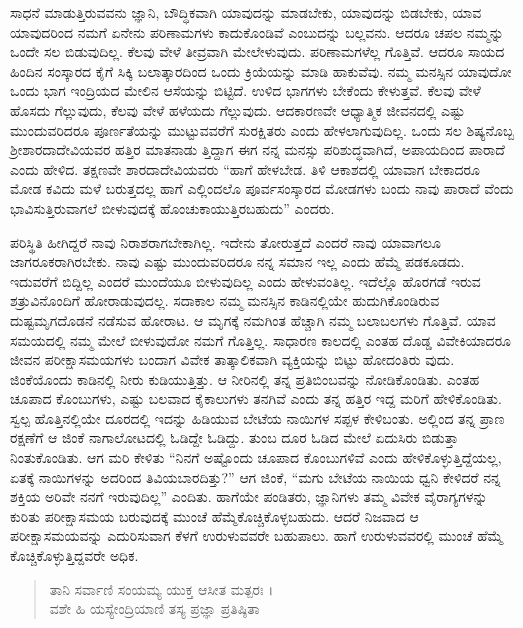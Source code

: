 ಸಾಧನೆ ಮಾಡುತ್ತಿರುವವನು ಜ್ಞಾನಿ, ಬೌದ್ಧಿಕವಾಗಿ ಯಾವುದನ್ನು ಮಾಡಬೇಕು, ಯಾವುದನ್ನು ಬಿಡಬೇಕು, ಯಾವ ಯಾವುದರಿಂದ ನಮಗೆ ಏನೇನು ಪರಿಣಾಮಗಳು ಕಾದುಕೊಂಡಿವೆ ಎಂಬುದನ್ನು ಬಲ್ಲವನು. ಆದರೂ ಚಪಲ ನಮ್ಮನ್ನು ಒಂದೇ ಸಲ ಬಿಡುವುದಿಲ್ಲ. ಕೆಲವು ವೇಳೆ ತೀವ್ರವಾಗಿ ಮೇಲೇಳುವುದು. ಪರಿಣಾಮಗಳೆಲ್ಲ ಗೊತ್ತಿವೆ. ಆದರೂ ಸಾಯದ ಹಿಂದಿನ ಸಂಸ್ಕಾರದ ಕೈಗೆ ಸಿಕ್ಕಿ ಬಲಾತ್ಕಾರದಿಂದ ಒಂದು ಕ್ರಿಯೆಯನ್ನು ಮಾಡಿ ಹಾಕುವೆವು. ನಮ್ಮ ಮನಸ್ಸಿನ ಯಾವುದೋ ಒಂದು ಭಾಗ ಇಂದ್ರಿಯದ ಮೇಲಿನ ಆಸೆಯನ್ನು ಬಿಟ್ಟಿದೆ. ಉಳಿದ ಭಾಗಗಳು ಬೇಕೆಂದು ಕೇಳುತ್ತವೆ. ಕೆಲವು ವೇಳೆ ಹೊಸದು ಗೆಲ್ಲುವುದು, ಕೆಲವು ವೇಳೆ ಹಳೆಯದು ಗೆಲ್ಲುವುದು. ಆದಕಾರಣವೇ ಆಧ್ಯಾತ್ಮಿಕ ಜೀವನದಲ್ಲಿ ಎಷ್ಟು ಮುಂದುವರಿದರೂ ಪೂರ್ಣತೆಯನ್ನು ಮುಟ್ಟುವವರೆಗೆ ಸುರಕ್ಷಿತರು ಎಂದು ಹೇಳಲಾಗುವುದಿಲ್ಲ. ಒಂದು ಸಲ ಶಿಷ್ಯನೊಬ್ಬ ಶ್ರೀಶಾರದಾದೇವಿಯವರ ಹತ್ತಿರ ಮಾತನಾಡು ತ್ತಿದ್ದಾಗ ಈಗ ನನ್ನ ಮನಸ್ಸು ಪರಿಶುದ್ಧವಾಗಿದೆ, ಅಪಾಯದಿಂದ ಪಾರಾದೆ ಎಂದು ಹೇಳಿದ. ತಕ್ಷಣವೇ ಶಾರದಾದೇವಿಯವರು “ಹಾಗೆ ಹೇಳಬೇಡ. ತಿಳಿ ಆಕಾಶದಲ್ಲಿ ಯಾವಾಗ ಬೇಕಾದರೂ ಮೋಡ ಕವಿದು ಮಳೆ ಬರುತ್ತದಲ್ಲ ಹಾಗೆ ಎಲ್ಲಿಂದಲೊ ಪೂರ್ವಸಂಸ್ಕಾರದ ಮೋಡಗಳು ಬಂದು ನಾವು ಪಾರಾದೆ ವೆಂದು ಭಾವಿಸುತ್ತಿರುವಾಗಲೆ ಬೀಳುವುದಕ್ಕೆ ಹೊಂಚುಕಾಯುತ್ತಿರಬಹುದು” ಎಂದರು.

ಪರಿಸ್ಥಿತಿ ಹೀಗಿದ್ದರೆ ನಾವು ನಿರಾಶರಾಗಬೇಕಾಗಿಲ್ಲ. ಇದೇನು ತೋರುತ್ತದೆ ಎಂದರೆ ನಾವು ಯಾವಾಗಲೂ ಜಾಗರೂಕರಾಗಿರಬೇಕು. ನಾವು ಎಷ್ಟು ಮುಂದುವರಿದರೂ ನನ್ನ ಸಮಾನ ಇಲ್ಲ ಎಂದು ಹೆಮ್ಮೆ ಪಡಕೂಡದು. ಇದುವರೆಗೆ ಬಿದ್ದಿಲ್ಲ ಎಂದರೆ ಮುಂದೆಯೂ ಬೀಳುವುದಿಲ್ಲ ಎಂದು ಹೇಳುವಂತಿಲ್ಲ. ಇದೆಲ್ಲೊ ಹೊರಗಡೆ ಇರುವ ಶತ್ರುವಿನೊಂದಿಗೆ ಹೋರಾಡುವುದಲ್ಲ. ಸದಾಕಾಲ ನಮ್ಮ ಮನಸ್ಸಿನ ಕಾಡಿನಲ್ಲಿಯೇ ಹುದುಗಿಕೊಂಡಿರುವ ದುಷ್ಟಮೃಗದೊಡನೆ ನಡೆಸುವ ಹೋರಾಟ. ಆ ಮೃಗಕ್ಕೆ ನಮಗಿಂತ ಹೆಚ್ಚಾಗಿ ನಮ್ಮ ಬಲಾಬಲಗಳು ಗೊತ್ತಿವೆ. ಯಾವ ಸಮಯದಲ್ಲಿ ನಮ್ಮ ಮೇಲೆ ಬೀಳುವುದೋ ನಮಗೆ ಗೊತ್ತಿಲ್ಲ. ಸಾಧಾರಣ ಕಾಲದಲ್ಲಿ ಎಂತಹ ದೊಡ್ಡ ವಿವೇಕಿಯಾದರೂ ಜೀವನ ಪರೀಕ್ಷಾಸಮಯಗಳು ಬಂದಾಗ ವಿವೇಕ ತಾತ್ಕಾಲಿಕವಾಗಿ ವ್ಯಕ್ತಿಯನ್ನು ಬಿಟ್ಟು ಹೋದಂತಿರು ವುದು. ಜಿಂಕೆಯೊಂದು ಕಾಡಿನಲ್ಲಿ ನೀರು ಕುಡಿಯುತ್ತಿತ್ತು. ಆ ನೀರಿನಲ್ಲಿ ತನ್ನ ಪ್ರತಿಬಿಂಬವನ್ನು ನೋಡಿಕೊಂಡಿತು. ಎಂತಹ ಚೂಪಾದ ಕೊಂಬುಗಳು, ಎಷ್ಟು ಬಲವಾದ ಕೈಕಾಲುಗಳು ತನಗಿವೆ ಎಂದು ತನ್ನ ಹತ್ತಿರ ಇದ್ದ ಮರಿಗೆ ಹೇಳಿಕೊಂಡಿತು. ಸ್ವಲ್ಪ ಹೊತ್ತಿನಲ್ಲಿಯೇ ದೂರದಲ್ಲಿ ಇದನ್ನು ಹಿಡಿಯುವ ಬೇಟೆಯ ನಾಯಿಗಳ ಸಪ್ಪಳ ಕೇಳಿಬಂತು. ಅಲ್ಲಿಂದ ತನ್ನ ಪ್ರಾಣ ರಕ್ಷಣೆಗೆ ಆ ಜಿಂಕೆ ನಾಗಾಲೋಟದಲ್ಲಿ ಓಡಿದ್ದೇ ಓಡಿದ್ದು. ತುಂಬ ದೂರ ಓಡಿದ ಮೇಲೆ ಏದುಸಿರು ಬಿಡುತ್ತಾ ನಿಂತುಕೊಂಡಿತು. ಆಗ ಮರಿ ಕೇಳಿತು “ನಿನಗೆ ಅಷ್ಟೊಂದು ಚೂಪಾದ ಕೊಂಬುಗಳಿವೆ ಎಂದು ಹೇಳಿಕೊಳ್ಳುತ್ತಿದ್ದೆಯಲ್ಲ, ಏತಕ್ಕೆ ನಾಯಿಗಳನ್ನು ಅದರಿಂದ ತಿವಿಯಬಾರದಿತ್ತು?” ಆಗ ಜಿಂಕೆ, “ಮಗು ಬೇಟೆಯ ನಾಯಿಯ ಧ್ವನಿ ಕೇಳಿದರೆ ನನ್ನ ಶಕ್ತಿಯ ಅರಿವೇ ನನಗೆ ಇರುವುದಿಲ್ಲ” ಎಂದಿತು. ಹಾಗೆಯೇ ಪಂಡಿತರು, ಜ್ಞಾನಿಗಳು ತಮ್ಮ ವಿವೇಕ ವೈರಾಗ್ಯಗಳನ್ನು ಕುರಿತು ಪರೀಕ್ಷಾಸಮಯ ಬರುವುದಕ್ಕೆ ಮುಂಚೆ ಹೆಮ್ಮೆಕೊಚ್ಚಿಕೊಳ್ಳಬಹುದು. ಆದರೆ ನಿಜವಾದ ಆ ಪರೀಕ್ಷಾಸಮಯವನ್ನು ಎದುರಿಸುವಾಗ ಕೆಳಗೆ ಉರುಳುವವರೇ ಬಹುಪಾಲು. ಹಾಗೆ ಉರುಳುವವರಲ್ಲಿ ಮುಂಚೆ ಹೆಮ್ಮೆ ಕೊಚ್ಚಿಕೊಳ್ಳುತ್ತಿದ್ದವರೇ ಅಧಿಕ.

\begin{verse}
ತಾನಿ ಸರ್ವಾಣಿ ಸಂಯಮ್ಯ ಯುಕ್ತ ಆಸೀತ ಮತ್ಪರಃ ।\\ವಶೇ ಹಿ ಯಸ್ಯೇಂದ್ರಿಯಾಣಿ ತಸ್ಯ ಪ್ರಜ್ಞಾ ಪ್ರತಿಷ್ಠಿತಾ 
\end{verse}


